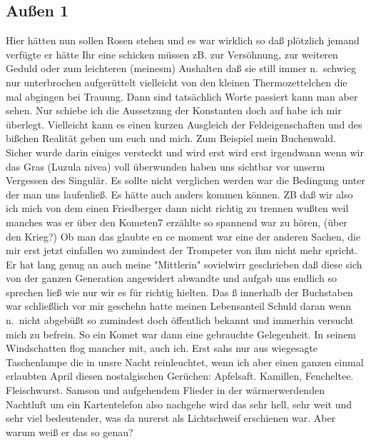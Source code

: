 \documentclass[
]{article}
\author{}
\date{\vspace{-2.5em}}
\begin{document}
\subsection{Außen 1}\label{auuxdfen-1}

Hier hätten nun sollen Rosen stehen und es war wirklich so daß plötzlich
jemand verfügte er hätte Ihr eine schicken müssen zB. zur Versöhnung,
zur weiteren Geduld oder zum leichteren (meinesm) Aushalten daß sie
still immer n.~schwieg nur unterbrochen aufgerüttelt vielleicht von den
kleinen Thermozettelchen die mal abgingen bei Trauung. Dann sind
tatsächlich Worte passiert kann man aber sehen. Nur schiebe ich die
Aussetzung der Konstanten doch auf habe ich mir überlegt. Vielleicht
kann es einen kurzen Ausgleich der Feldeigenschaften und des bißchen
Realität geben um euch und mich. Zum Beispiel mein Buchenwald. Sicher
wurde darin einiges versteckt und wird erst wird erst irgendwann wenn
wir das Gras (Luzula nivea) voll überwunden haben uns sichtbar vor
unserm Vergessen des Singulär. Es sollte nicht verglichen werden war die
Bedingung unter der man uns laufenließ. Es hätte auch anders kommen
können. ZB daß wir also ich mich von dem einen Friedberger dann nicht
richtig zu trennen wußten weil manches was er über den Kometen7 erzählte
so spannend war zu hören, (über den Krieg?) Ob man das glaubte en ce
moment war eine der anderen Sachen, die mir erst jetzt einfallen wo
zumindest der Trompeter von ihm nicht mehr spricht. Er hat lang genug an
auch meine "Mittlerin" sovielwirr geschrieben daß diese sich von der
ganzen Generation angewidert abwandte und aufgab uns endlich so sprechen
ließ wie nur wir es für richtig hielten. Das ß innerhalb der Buchstaben
war schließlich vor mir geschehn hatte meinen Lebensanteil Schuld daran
wenn n.~nicht abgebüßt so zumindest doch öffentlich bekannt und immerhin
versucht mich zu befrein. So ein Komet war dann eine gebrauchte
Gelegenheit. In seinem Windschatten flog mancher mit, auch ich. Erst
sahs nur aus wiegesagte Taschenlampe die in unsre Nacht reinleuchtet,
wenn ich aber einen ganzen einmal erlaubten April diesen nostalgischen
Gerüchen: Apfelsaft. Kamillen, Fencheltee. Fleischwurst. Samson und
aufgehendem Flieder in der wärmerwerdenden Nachtluft um ein
Kartentelefon also nachgehe wird das sehr hell, sehr weit und sehr viel
bedeutender, was da nurerst als Lichtschweif erschienen war. Aber warum
weiß er das so genau?
\end{document}

